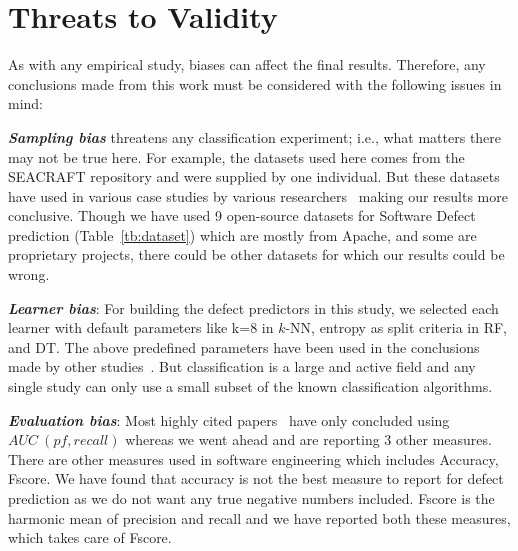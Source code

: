 \documentclass[10pt,conference]{IEEEtran}
\theoremstyle{break}
\theoremstyle{break}
\newcommand{\tion}[1]{{\S}\ref{sect:#1}}
\begin{document}
\section{Threats to Validity}
\label{sect:validity}

As with any empirical study, biases can affect the final
results. Therefore, any conclusions made from this work must be considered with the following issues in mind:

\textbf{\textit{Sampling bias}} threatens any classification experiment; i.e., what matters there may not be true here. For example, the datasets used here comes from the SEACRAFT repository and were supplied by one individual. But these datasets have used in various case studies by various researchers~\cite{he2012investigation,peters2013better,peters2013balancing,turhan2013empirical} making our results more conclusive.
Though we have used 9 open-source datasets for Software Defect prediction (Table~\ref{tb:dataset}) which are mostly from Apache, and some are proprietary projects, there could be other datasets for which our results could be wrong.

\textbf{\textit{Learner bias}}: For building the defect predictors in this
study, we selected each learner with default parameters like k=8 in $k$-NN, entropy as split criteria in RF, and DT. The above predefined parameters have been used in the conclusions made by other studies~\cite{ghotra2015revisiting,tantithamthavorn2016automated}. But classification is a large and active field and any single study can only use a small subset of the known classification algorithms.

\textbf{\textit{Evaluation bias}}: Most highly cited papers~\cite{ghotra2015revisiting,tantithamthavorn2016automated} have only concluded using $AUC\ (pf, recall)$ whereas we went ahead and are reporting 3 other measures. There are other measures used in software engineering which includes Accuracy, Fscore. We have found that accuracy is not the best measure to report for defect prediction as we do not want any true negative numbers included. Fscore is the harmonic mean of precision and recall and we have reported both these measures, which takes care of Fscore.

\end{document}
